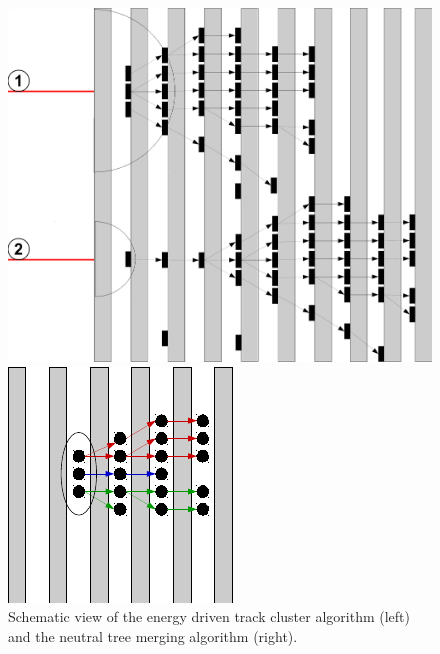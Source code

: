 \documentclass[cits]{JINST}
\begin{document}
\begin{figure}[!h]
  \begin{minipage}{0.58\linewidth}
    \begin{center}
      \includegraphics[width=0.8\linewidth]{EnergyDrivenTrackClusterAssociation.pdf}
    \end{center}
  \end{minipage}
  \begin{minipage}{0.4\linewidth}
    \begin{center}
      \includegraphics[width=0.6\linewidth]{NeutralTreeMerging.pdf}
    \end{center}
  \end{minipage}
  \caption{\label{ARBOR_ENERGY_DRIVEN_TRACK_CLUSTER_ASSOCIATION} \label{ARBOR_NEUTRAL_TREE_MERGING} Schematic view of the energy driven track cluster algorithm (left) and the neutral tree merging algorithm (right).}
\end{figure}
\end{document}
